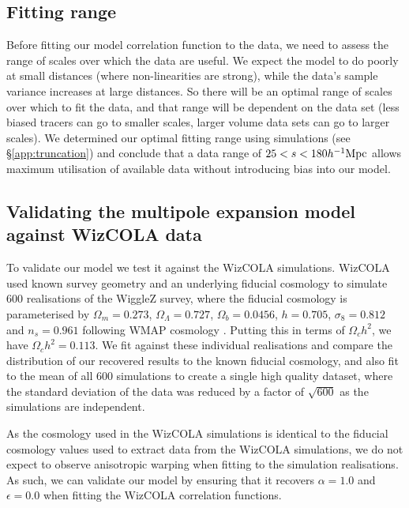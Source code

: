 \documentclass[a4paper,fleqn,usenatbib]{mnras}
\newcommand{\hMpc}{h^{-1} {\rm Mpc}} %
\begin{document}
\subsection{Fitting range} \label{sec:trunc}
Before fitting our model correlation function to the data, we need to assess the range of scales over which the data are useful.  We expect the model to do poorly at small distances (where non-linearities are strong), while the data's sample variance increases at large distances.  So there will be an optimal range of scales over which to fit the data, and that range will be dependent on the data set (less biased tracers can go to smaller scales, larger volume data sets can go to larger scales).  We determined our optimal fitting range using simulations (see \S\ref{app:truncation})  and conclude that a data range of $25 < s < 180 \hMpc$ allows maximum utilisation of available data without introducing bias into our model. 




\subsection{Validating the multipole expansion model against WizCOLA data}

 To validate our model we test it against the WizCOLA simulations.  WizCOLA used known survey geometry and an underlying fiducial cosmology to simulate 600 realisations of the WiggleZ survey, where the fiducial cosmology is parameterised by $\Omega_m = 0.273$, $\Omega_\Lambda = 0.727$, $\Omega_b = 0.0456$, $h=0.705$, $\sigma_8 = 0.812$ and $n_s = 0.961$ following WMAP cosmology \citep{Komatsu2009}.  Putting this in terms of $\Omega_c h^2$, we have $\Omega_c h^2 = 0.113$. We fit against these individual realisations and compare the distribution of our recovered results to the known fiducial cosmology, and also fit to the mean of all 600 simulations to create a single high quality dataset, where the standard deviation of the data was reduced by a factor of $\sqrt{600}$ as the simulations are independent. 



As the cosmology used in the WizCOLA simulations is identical to the fiducial cosmology values used to extract data from the WizCOLA simulations, we do not expect to observe anisotropic warping when fitting to the simulation realisations.   As such, we can validate our model by ensuring that it recovers $\alpha = 1.0$ and $\epsilon = 0.0$ when fitting the WizCOLA correlation functions.
\end{document}
